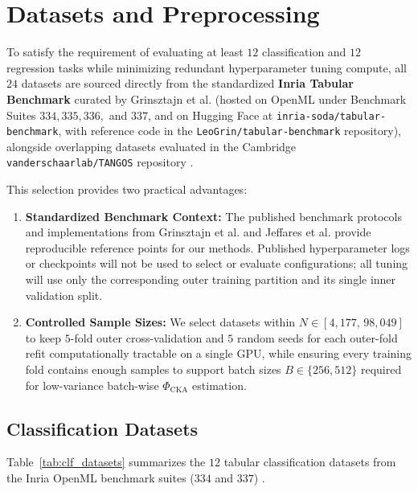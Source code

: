 \documentclass[11pt, a4paper]{article}
\begin{document}
\section{Datasets and Preprocessing}

To satisfy the requirement of evaluating at least $12$ classification and $12$ regression tasks while minimizing redundant hyperparameter tuning compute, all $24$ datasets are sourced directly from the standardized \textbf{Inria Tabular Benchmark} curated by Grinsztajn et al. \cite{grinsztajn2022why} (hosted on OpenML under Benchmark Suites $334, 335, 336,$ and $337$, and on Hugging Face at \texttt{inria-soda/tabular-benchmark}, with reference code in the \texttt{LeoGrin/tabular-benchmark} repository), alongside overlapping datasets evaluated in the Cambridge \texttt{vanderschaarlab/TANGOS} repository \cite{jeffares2023tangos}.

This selection provides two practical advantages:
\begin{enumerate}
    \item \textbf{Standardized Benchmark Context:} The published benchmark protocols and implementations from Grinsztajn et al. \cite{grinsztajn2022why} and Jeffares et al. \cite{jeffares2023tangos} provide reproducible reference points for our methods. Published hyperparameter logs or checkpoints will not be used to select or evaluate configurations; all tuning will use only the corresponding outer training partition and its single inner validation split.
    \item \textbf{Controlled Sample Sizes:} We select datasets within $N \in [4{,}177, \, 98{,}049]$ to keep $5$-fold outer cross-validation and $5$ random seeds for each outer-fold refit computationally tractable on a single GPU, while ensuring every training fold contains enough samples to support batch sizes $B \in \{256, 512\}$ required for low-variance batch-wise $\Phi_{\text{CKA}}$ estimation.
\end{enumerate}

\subsection{Classification Datasets}
Table~\ref{tab:clf_datasets} summarizes the $12$ tabular classification datasets from the Inria OpenML benchmark suites ($334$ and $337$) \cite{grinsztajn2022why}.
\end{document}
